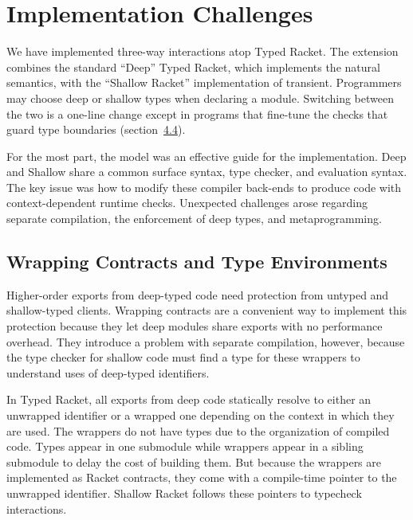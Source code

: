 \documentclass[screen=true, natbib=false, 10pt, sigplan]{acmart}
\newcommand{\sectionNewpage}{}
\newcommand{\SecRef}[2]{section~#1}
\newcommand{\SectionNumberLink}[2]{\hyperref[#1]{#2}}
\let\SOriginalthesubsection\thesubsection
\let\SOriginalthesubsubsection\thesubsubsection
\newcommand{\Ssection}[2]{\section[#1]{#2}\let\thesubsection\SOriginalthesubsection}
\newcommand{\Ssubsection}[2]{\subsection[#1]{#2}\let\thesubsubsection\SOriginalthesubsubsection}
\begin{document}
\sectionNewpage

\Ssection{Implementation Challenges}{Implementation Challenges}\label{t:x28part_x22secx3aimplementationx22x29}

We have implemented three{-}way interactions atop Typed Racket.
The extension combines the standard {``}Deep{''} Typed Racket, which implements the
natural semantics, with the {``}Shallow Racket{''}
implementation of transient.
Programmers may choose deep or shallow types
when declaring a module.
Switching between the two is a one{-}line change except in programs that
fine{-}tune the checks that guard type boundaries
(\SecRef{\SectionNumberLink{t:x28part_x22secx3aimplementationx3aapix22x29}{4.4}}{Three{-}Way Boundary Utilities}).

For the most part, the model was an effective guide for the implementation.
Deep and Shallow share a common surface syntax, type checker,
and evaluation syntax.
The key issue was how to modify these compiler back{-}ends to produce code
with context{-}dependent runtime checks.
Unexpected challenges arose regarding separate compilation,
the enforcement of deep types, and metaprogramming.

\Ssubsection{Wrapping Contracts and Type Environments}{Wrapping Contracts and Type Environments}\label{t:x28part_x22secx3aimplementationx3actcx2dindirectx22x29}

Higher{-}order exports from deep{-}typed code need protection from untyped
and shallow{-}typed clients.
Wrapping contracts are a convenient way to implement this
protection because they let deep modules share exports with no performance
overhead.
They introduce a problem with separate compilation, however, because the type checker for shallow
code must find a type for these wrappers to understand uses of
deep{-}typed identifiers.

In Typed Racket, all exports from deep code statically resolve to either an
unwrapped identifier or a wrapped one depending on the context in which they
are used.
The wrappers do not have types due to the organization of compiled code.
Types appear in one submodule while wrappers appear
in a sibling submodule to delay the cost of building them.
But because the wrappers are implemented as Racket contracts,
they come with a compile{-}time pointer to the unwrapped identifier.
Shallow Racket follows these pointers to typecheck interactions.
\end{document}
